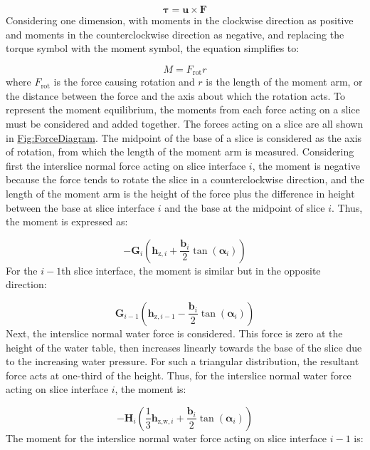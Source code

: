 \documentclass[12pt]{article}
\begin{document}
\begin{displaymath}
\symbf{τ}=\symbf{u}\times\symbf{F}
\end{displaymath}
Considering one dimension, with moments in the clockwise direction as positive and moments in the counterclockwise direction as negative, and replacing the torque symbol with the moment symbol, the equation simplifies to:

\begin{displaymath}
M={F_{\text{rot}}} r
\end{displaymath}
where ${F_{\text{rot}}}$ is the force causing rotation and $r$ is the length of the moment arm, or the distance between the force and the axis about which the rotation acts. To represent the moment equilibrium, the moments from each force acting on a slice must be considered and added together. The forces acting on a slice are all shown in \hyperref[Figure:ForceDiagram]{Fig:ForceDiagram}. The midpoint of the base of a slice is considered as the axis of rotation, from which the length of the moment arm is measured. Considering first the interslice normal force acting on slice interface $i$, the moment is negative because the force tends to rotate the slice in a counterclockwise direction, and the length of the moment arm is the height of the force plus the difference in height between the base at slice interface $i$ and the base at the midpoint of slice $i$. Thus, the moment is expressed as:

\begin{displaymath}
-{\symbf{G}}_{i} \left({\symbf{h}_{\text{z},i}}+\frac{{\symbf{b}}_{i}}{2} \tan\left({\symbf{α}}_{i}\right)\right)
\end{displaymath}
For the $i-1$th slice interface, the moment is similar but in the opposite direction:

\begin{displaymath}
{\symbf{G}}_{i-1} \left({\symbf{h}_{\text{z},i-1}}-\frac{{\symbf{b}}_{i}}{2} \tan\left({\symbf{α}}_{i}\right)\right)
\end{displaymath}
Next, the interslice normal water force is considered. This force is zero at the height of the water table, then increases linearly towards the base of the slice due to the increasing water pressure. For such a triangular distribution, the resultant force acts at one-third of the height. Thus, for the interslice normal water force acting on slice interface $i$, the moment is:

\begin{displaymath}
-{\symbf{H}}_{i} \left(\frac{1}{3} {\symbf{h}_{\text{z,w},i}}+\frac{{\symbf{b}}_{i}}{2} \tan\left({\symbf{α}}_{i}\right)\right)
\end{displaymath}
The moment for the interslice normal water force acting on slice interface $i-1$ is:
\end{document}
